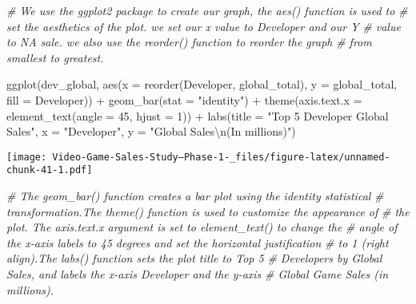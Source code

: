 \documentclass[
]{article}
\newenvironment{Shaded}{\begin{snugshade}}{\end{snugshade}}
\newcommand{\AttributeTok}[1]{\textcolor[rgb]{0.77,0.63,0.00}{#1}}
\newcommand{\CommentTok}[1]{\textcolor[rgb]{0.56,0.35,0.01}{\textit{#1}}}
\newcommand{\DecValTok}[1]{\textcolor[rgb]{0.00,0.00,0.81}{#1}}
\newcommand{\FunctionTok}[1]{\textcolor[rgb]{0.00,0.00,0.00}{#1}}
\newcommand{\NormalTok}[1]{#1}
\newcommand{\SpecialCharTok}[1]{\textcolor[rgb]{0.00,0.00,0.00}{#1}}
\newcommand{\StringTok}[1]{\textcolor[rgb]{0.31,0.60,0.02}{#1}}
\begin{document}
\begin{Shaded}
\begin{Highlighting}[]
\CommentTok{\# We use the ggplot2 package to create our graph, the aes() function is used to}
\CommentTok{\# set the aesthetics of the plot. we set our x value to Developer and our Y}
\CommentTok{\# value to NA sale. we also use the reorder() function to reorder the graph}
\CommentTok{\# from smallest to greatest.}

\FunctionTok{ggplot}\NormalTok{(dev\_global, }\FunctionTok{aes}\NormalTok{(}\AttributeTok{x =} \FunctionTok{reorder}\NormalTok{(Developer, global\_total), }\AttributeTok{y =}\NormalTok{ global\_total, }\AttributeTok{fill =}\NormalTok{ Developer)) }\SpecialCharTok{+}
    \FunctionTok{geom\_bar}\NormalTok{(}\AttributeTok{stat =} \StringTok{"identity"}\NormalTok{) }\SpecialCharTok{+} \FunctionTok{theme}\NormalTok{(}\AttributeTok{axis.text.x =} \FunctionTok{element\_text}\NormalTok{(}\AttributeTok{angle =} \DecValTok{45}\NormalTok{, }\AttributeTok{hjust =} \DecValTok{1}\NormalTok{)) }\SpecialCharTok{+}
    \FunctionTok{labs}\NormalTok{(}\AttributeTok{title =} \StringTok{"Top 5 Developer Global Sales"}\NormalTok{, }\AttributeTok{x =} \StringTok{"Developer"}\NormalTok{, }\AttributeTok{y =} \StringTok{"Global Sales}\SpecialCharTok{\textbackslash{}n}\StringTok{(In millions)"}\NormalTok{)}
\end{Highlighting}
\end{Shaded}

\texttt{[image: Video-Game-Sales-Study--Phase-1-\_files/figure-latex/unnamed-chunk-41-1.pdf]}

\begin{Shaded}
\begin{Highlighting}[]
\CommentTok{\# The geom\_bar() function creates a bar plot using the \textquotesingle{}identity\textquotesingle{} statistical}
\CommentTok{\# transformation.The theme() function is used to customize the appearance of}
\CommentTok{\# the plot. The axis.text.x argument is set to element\_text() to change the}
\CommentTok{\# angle of the x{-}axis labels to 45 degrees and set the horizontal justification}
\CommentTok{\# to 1 (right align).The labs() function sets the plot title to \textquotesingle{}Top 5}
\CommentTok{\# Developers by Global Sales\textquotesingle{}, and labels the x{-}axis \textquotesingle{}Developer\textquotesingle{} and the y{-}axis}
\CommentTok{\# \textquotesingle{}Global Game Sales (in millions)\textquotesingle{}.}
\end{Highlighting}
\end{Shaded}
\end{document}
